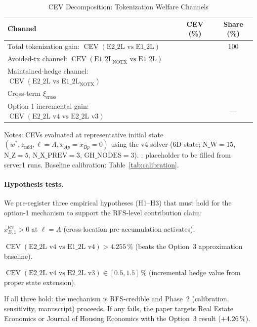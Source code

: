 \begin{table}[ht]
    \centering
    \caption{CEV Decomposition: Tokenization Welfare Channels}
    \label{tab:cev_decomp}
    \renewcommand{\arraystretch}{1.20}
    \begin{tabular}{lcc}
        \toprule
        Channel & CEV (\%) & Share (\%) \\
        \midrule
        Total tokenization gain:
            $\operatorname{CEV}(\text{E2\_2L vs E1\_2L})$
            & {\sc [x.xx]} & 100 \\
        \quad Avoided-tx channel:
            $\operatorname{CEV}(\text{E1\_2L}_{\text{NOTX}} \text{ vs E1\_2L})$
            & {\sc [x.xx]} & {\sc [xx]} \\
        \quad Maintained-hedge channel:
            $\operatorname{CEV}(\text{E2\_2L vs E1\_2L}_{\text{NOTX}})$
            & {\sc [x.xx]} & {\sc [xx]} \\
        \quad Cross-term $\xi_{\text{cross}}$
            & {\sc [x.xx]} & {\sc [xx]} \\
        \midrule
        Option 1 incremental gain:
            $\operatorname{CEV}(\text{E2\_2L v4 vs E2\_2L v3})$
            & {\sc [x.xx]} & --- \\
        \bottomrule
    \end{tabular}
    \smallskip
    \begin{minipage}{\linewidth}
        \footnotesize
        Notes: CEVs evaluated at representative initial state
        $(w^{\ast}, z_{\text{mid}}, \ell = A, x_{Ap} = x_{Bp} = 0)$
        using the v4 solver (6D state; $\text{N\_W}=15$,
        $\text{N\_Z}=5$, $\text{N\_X\_PREV}=3$, $\text{GH\_NODES}=3$).
        {\sc [x.xx]}: placeholder to be filled from server1 runs.
        Baseline calibration: Table~\ref{tab:calibration}.
    \end{minipage}
\end{table}

\paragraph{Hypothesis tests.}
We pre-register three empirical hypotheses (H1--H3) that must hold for
the option-1 mechanism to support the RFS-level contribution claim:
\begin{description}[noitemsep]
    \item[H1] $\overline{x}_{B,1}^{\text{E2}} > 0$ at $\ell = A$
              (cross-location pre-accumulation activates).
    \item[H2] $\operatorname{CEV}(\text{E2\_2L v4 vs E1\_2L v4}) > 4.255\,\%$
              (beats the Option~3 approximation baseline).
    \item[H3] $\operatorname{CEV}(\text{E2\_2L v4 vs E2\_2L v3}) \in [0.5, 1.5]\,\%$
              (incremental hedge value from proper state extension).
\end{description}
If all three hold: the mechanism is RFS-credible and Phase~2
(calibration, sensitivity, manuscript) proceeds.  If any fails, the
paper targets Real Estate Economics or Journal of Housing Economics
with the Option~3 result ($+4.26\,\%$).


